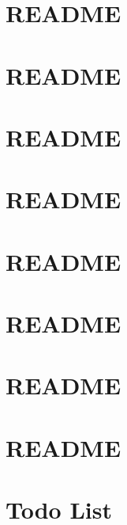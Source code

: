 \let\mypdfximage\pdfximage\def\pdfximage{\immediate\mypdfximage}\documentclass[twoside]{book}
\newcommand{\+}{\discretionary{\mbox{\scriptsize$\hookleftarrow$}}{}{}}
\begin{document}
\chapter{R\+E\+A\+D\+ME}
\label{md_myLibraries_logger_README}

\chapter{R\+E\+A\+D\+ME}
\label{md_myLibraries_pluginLoader_README}

\chapter{R\+E\+A\+D\+ME}
\label{md_myLibraries_safeContainers_README}

\chapter{R\+E\+A\+D\+ME}
\label{md_myLibraries_testCaseAnalyser_README}

\chapter{R\+E\+A\+D\+ME}
\label{md_myLibraries_testRunner_README}

\chapter{R\+E\+A\+D\+ME}
\label{md_myLibraries_threadPool_README}

\chapter{R\+E\+A\+D\+ME}
\label{md_myLibraries_timeTicker_README}

\chapter{R\+E\+A\+D\+ME}
\label{md_myLibraries_utility_README}

\chapter{Todo List}
\label{todo}

\end{document}
